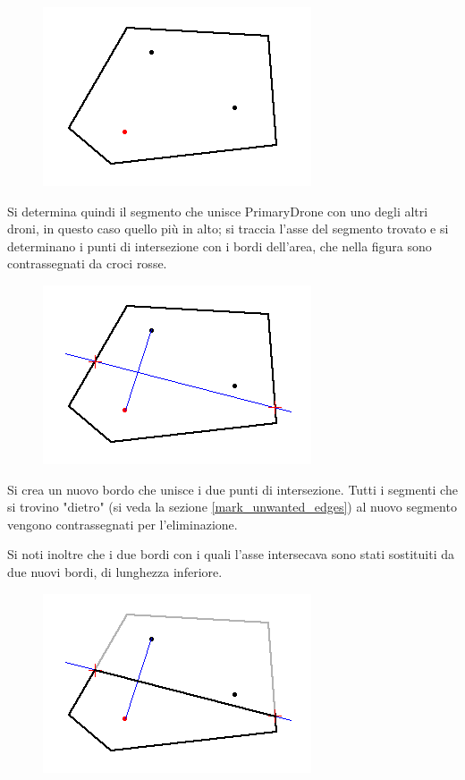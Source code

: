 \documentclass[11pt,a4paper]{report}
\newcommand{\name}[1]{{\ttfamily #1}}
\begin{document}
\begin{figure}[H]
\centering
\includegraphics[scale=0.7]{voronoi1.png}
\end{figure}

Si determina quindi il segmento che unisce \name{PrimaryDrone} con uno degli altri droni, in questo caso quello più in alto; si traccia l'asse del segmento trovato e si determinano i punti di intersezione con i bordi dell'area, che nella figura sono contrassegnati da croci rosse.

\begin{figure}[H]
\centering
\includegraphics[scale=0.7]{voronoi2.png}
\end{figure}

Si crea un nuovo bordo che unisce i due punti di intersezione. Tutti i segmenti che si trovino "dietro" (si veda la sezione \ref{mark_unwanted_edges}) al nuovo segmento vengono contrassegnati per l'eliminazione.

Si noti inoltre che i due bordi con i quali l'asse intersecava sono stati sostituiti da due nuovi bordi, di lunghezza inferiore.

\begin{figure}[H]
\centering
\includegraphics[scale=0.7]{voronoi3.png}
\end{figure}
\end{document}
